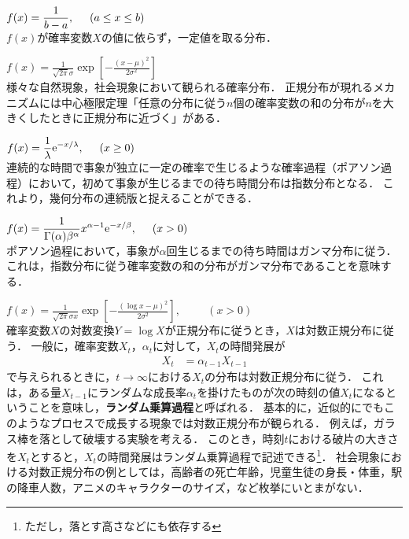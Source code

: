 %
\begin{description}
\setlength{\itemsep}{0.3cm} %
\item[一様分布：]$ \displaystyle f(x) = \frac{1}{b-a}, \hspace{0.5cm} (a\leq x \leq b) $　\\[10pt]
%
$ f(x) $が確率変数$ X $の値に依らず，一定値を取る分布．

\item[正規分布：]$ \displaystyle f(x) = \frac{1}{\sqrt{2\pi} \sigma} \exp\left[- \frac{(x-\mu)^{2}}{2\sigma^{2}}\right]$　\\[10pt]
%
様々な自然現象，社会現象において観られる確率分布．
%
正規分布が現れるメカニズムには中心極限定理「任意の分布に従う$ n $個の確率変数の和の分布が$ n $を大きくしたときに正規分布に近づく」がある．
%

\item[指数分布：]$ \displaystyle f(x) = \frac{1}{\lambda} \mathrm{e}^{-x/\lambda}, \hspace{0.5cm} (x \geq 0) $　\\[10pt]
%
連続的な時間で事象が独立に一定の確率で生じるような確率過程（ポアソン過程）において，初めて事象が生じるまでの待ち時間分布は指数分布となる．
%
これより，幾何分布の連続版と捉えることができる．
%
 
\item[ガンマ分布：]$ \displaystyle f(x) = \frac{1}{\Gamma(\alpha)\beta^{\alpha}}x^{\alpha - 1} \mathrm{e}^{-x/\beta}, \hspace{0.5cm} (x > 0) $　\\[10pt]
%
ポアソン過程において，事象が$ \alpha $回生じるまでの待ち時間はガンマ分布に従う．
%
これは，指数分布に従う確率変数の和の分布がガンマ分布であることを意味する．
%

\item[対数正規分布：]$ \displaystyle f(x)
	= \frac{1}{\sqrt{2\pi}\sigma x} \exp \left[ - \frac{(\log x - \mu)^{2}}{2\sigma^{2}}\right], \hspace{1cm} (x > 0) $　\\[10pt]
%
確率変数$ X $の対数変換$ Y=\log X $が正規分布に従うとき，$ X $は対数正規分布に従う．
%
一般に，確率変数$ X_{t} $，$ \alpha_{t} $に対して，$ X_{t} $の時間発展が
%
\begin{align*}
	X_{t} &= \alpha_{t-1} X_{t-1}
\end{align*}
%
で与えられるときに，$ t\to \infty $における$ X_{t} $の分布は対数正規分布に従う．
%
これは，ある量$ X_{t-1} $にランダムな成長率$ \alpha_{t} $を掛けたものが次の時刻の値$ X_{t} $になるということを意味し，\textbf{ランダム乗算過程}と呼ばれる．
%
基本的に，近似的にでもこのようなプロセスで成長する現象では対数正規分布が観られる．
%
例えば，ガラス棒を落として破壊する実験を考える．
%
このとき，時刻$ t $における破片の大きさを$ X_{t} $とすると，$ X_{t} $の時間発展はランダム乗算過程で記述できる\footnote{ただし，落とす高さなどにも依存する}．
%
社会現象における対数正規分布の例としては，高齢者の死亡年齢，児童生徒の身長・体重，駅の降車人数，アニメのキャラクターのサイズ，など枚挙にいとまがない\cite{i}．
%


\end{description}
